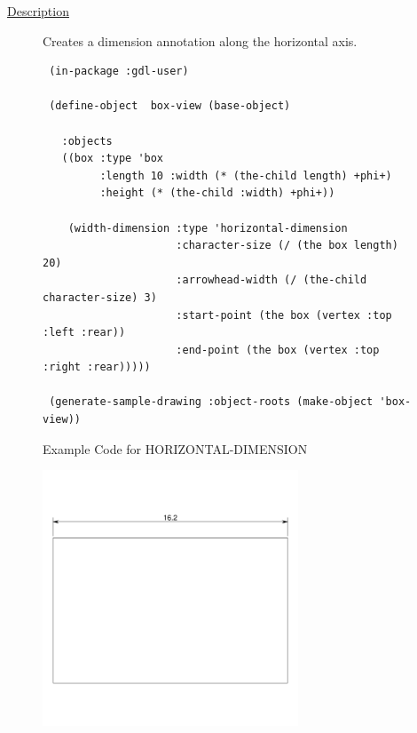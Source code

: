 \documentclass [11pt]{book}
\begin{document}
\begin{itemize}
\begin{description}

\item [
\underline{Description}]


Creates a dimension annotation along the horizontal axis.



\end{description}




\begin{figure}
\begin{lrbox}{\boxedverb}
\begin{minipage}{\linewidth}
{\small

\begin{verbatim}          
 (in-package :gdl-user)

 (define-object  box-view (base-object)
   
   :objects
   ((box :type 'box
         :length 10 :width (* (the-child length) +phi+)
         :height (* (the-child :width) +phi+))
   
    (width-dimension :type 'horizontal-dimension
                     :character-size (/ (the box length) 20)
                     :arrowhead-width (/ (the-child character-size) 3)
                     :start-point (the box (vertex :top :left :rear))
                     :end-point (the box (vertex :top :right :rear)))))

 (generate-sample-drawing :object-roots (make-object 'box-view)) 
\end{verbatim}}
\end{minipage}
\end{lrbox}
\fbox{\usebox{\boxedverb}}

\caption{Example Code for HORIZONTAL-DIMENSION}

\label{fig:example-code-HORIZONTAL-DIMENSION}

\end{figure}

\begin{figure}
\begin{center}
\includegraphics[width=3in,height=3in]{../images/example-HORIZONTAL-DIMENSION.pdf}
\end{center}


\end{figure}
\end{itemize}
\end{document}
